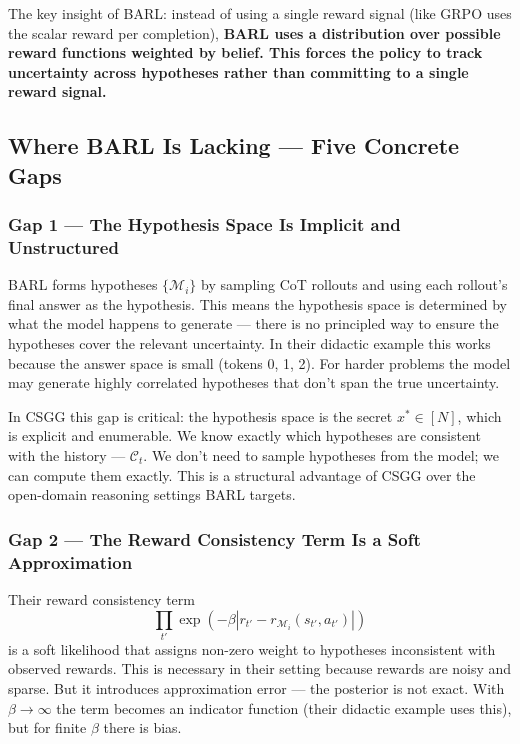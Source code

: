 \documentclass[11pt]{article}
\theoremstyle{plain}
\theoremstyle{definition}
\theoremstyle{remark}
\begin{document}
The key insight of BARL: instead of using a single reward signal (like GRPO uses the scalar reward per completion), \textbf{BARL uses a distribution over possible reward functions weighted by belief. This forces the policy to track uncertainty across hypotheses rather than committing to a single reward signal.}

\subsection{Where BARL Is Lacking --- Five Concrete Gaps}

\subsubsection{Gap 1 --- The Hypothesis Space Is Implicit and Unstructured}

BARL forms hypotheses $\{\mathcal{M}_i\}$ by sampling CoT rollouts and using each rollout's final answer as the hypothesis. This means the hypothesis space is determined by what the model happens to generate --- there is no principled way to ensure the hypotheses cover the relevant uncertainty. In their didactic example this works because the answer space is small (tokens 0, 1, 2). For harder problems the model may generate highly correlated hypotheses that don't span the true uncertainty.

In CSGG this gap is critical: the hypothesis space is the secret $x^* \in [N]$, which is explicit and enumerable. We know exactly which hypotheses are consistent with the history --- $\mathcal{C}_t$. We don't need to sample hypotheses from the model; we can compute them exactly. This is a structural advantage of CSGG over the open-domain reasoning settings BARL targets.

\subsubsection{Gap 2 --- The Reward Consistency Term Is a Soft Approximation}

Their reward consistency term
\[
\prod_{t'}
\exp\left(
-\beta
\left|
r_{t'} - r_{\mathcal{M}_i}(s_{t'},a_{t'})
\right|
\right)
\]
is a soft likelihood that assigns non-zero weight to hypotheses inconsistent with observed rewards. This is necessary in their setting because rewards are noisy and sparse. But it introduces approximation error --- the posterior is not exact. With $\beta \to \infty$ the term becomes an indicator function (their didactic example uses this), but for finite $\beta$ there is bias.
\end{document}
